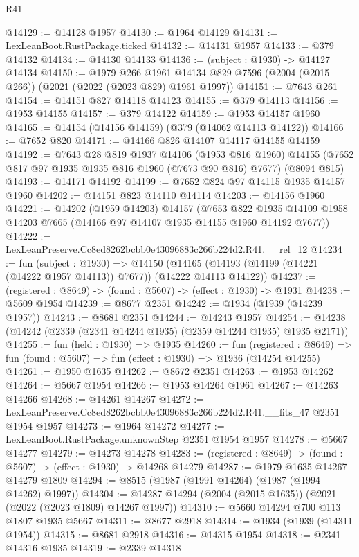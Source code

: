 \begin{lexlean}{R41}
\begin{coremodule}
@14129 := @14128 @1957
@14130 := @1964 @14129
@14131 := LexLeanBoot.RustPackage.ticked
@14132 := @14131 @1957
@14133 := @379 @14132
@14134 := @14130 @14133
@14136 := (subject : @1930) -> @14127 @14134
@14150 := @1979
    @266
    @1961
    @14134
    @829
    @7596
    (@2004 (@2015 @266))
    (@2021 (@2022 (@2023 @829) @1961 @1997))
@14151 := @7643 @261
@14154 := @14151 @827 @14118 @14123
@14155 := @379 @14113
@14156 := @1953 @14155
@14157 := @379 @14122
@14159 := @1953 @14157 @1960
@14165 := @14154 (@14156 @14159) (@379 (@14062 @14113 @14122))
@14166 := @7652 @820
@14171 := @14166 @826 @14107 @14117 @14155 @14159
@14192 := @7643
    @28
    @819
    @1937
    @14106
    (@1953 @816 @1960)
    @14155
    (@7652 @817 @97 @1935 @1935 @816 @1960 (@7673 @90 @816) @7677)
    (@8094 @815)
@14193 := @14171 @14192
@14199 := @7652 @824 @97 @14115 @1935 @14157 @1960
@14202 := @14151 @823 @14110 @14114
@14203 := @14156 @1960
@14221 := @14202
    (@1959 @14203)
    @14157
    (@7653 @822 @1935 @14109 @1958 @14203 @7665 (@14166 @97 @14107 @1935 @14155 @1960 @14192 @7677))
@14222 := LexLeanPreserve.Cc8ed8262bcbb0e43096883c266b224d2.R41.__rel_12
@14234 := fun (subject : @1930) =>
  @14150 (@14165 (@14193 (@14199 (@14221 (@14222 @1957 @14113)) @7677)) (@14222 @14113 @14122))
@14237 := (registered : @8649) -> (found : @5607) -> (effect : @1930) -> @1931
@14238 := @5609 @1954
@14239 := @8677 @2351
@14242 := @1934 (@1939 (@14239 @1957))
@14243 := @8681 @2351
@14244 := @14243 @1957
@14254 := @14238 (@14242 (@2339 (@2341 @14244 @1935) (@2359 @14244 @1935) @1935 @2171))
@14255 := fun (held : @1930) => @1935
@14260 := fun (registered : @8649) =>
  fun (found : @5607) => fun (effect : @1930) => @1936 (@14254 @14255)
@14261 := @1950 @1635
@14262 := @8672 @2351
@14263 := @1953 @14262
@14264 := @5667 @1954
@14266 := @1953 @14264 @1961
@14267 := @14263 @14266
@14268 := @14261 @14267
@14272 := LexLeanPreserve.Cc8ed8262bcbb0e43096883c266b224d2.R41.__fits_47 @2351 @1954 @1957
@14273 := @1964 @14272
@14277 := LexLeanBoot.RustPackage.unknownStep @2351 @1954 @1957
@14278 := @5667 @14277
@14279 := @14273 @14278
@14283 := (registered : @8649) -> (found : @5607) -> (effect : @1930) -> @14268 @14279
@14287 := @1979 @1635 @14267 @14279 @1809
@14294 := @8515 (@1987 (@1991 @14264) (@1987 (@1994 @14262) @1997))
@14304 := @14287 @14294 (@2004 (@2015 @1635)) (@2021 (@2022 (@2023 @1809) @14267 @1997))
@14310 := @5660 @14294 @700 @113 @1807 @1935 @5667
@14311 := @8677 @2918
@14314 := @1934 (@1939 (@14311 @1954))
@14315 := @8681 @2918
@14316 := @14315 @1954
@14318 := @2341 @14316 @1935
@14319 := @2339 @14318

\end{coremodule}
\end{lexlean}
